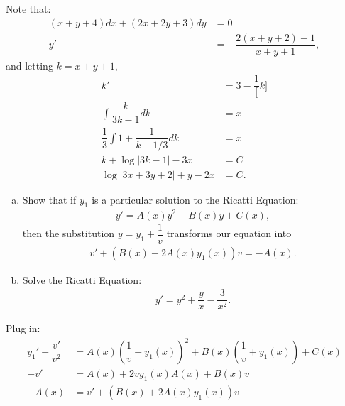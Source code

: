 \documentclass{article}
\begin{document}
    \newpage
    \begin{solution}[Solution 4d]
        Note that:
        \begin{align}
            (x+y+4)dx + (2x+2y+3)dy &= 0 \\ 
            y' &= -\dfrac{2(x+y+2)-1}{x+y+1},
        \end{align}
        and letting $k = x+y+1$,
        \begin{align}
            k' &= 3 - \dfrac{1}[k] \\
            \int \dfrac{k}{3k-1} dk &= x \\ 
            \dfrac{1}{3} \int 1 + \dfrac{1}{k - 1/3} dk &= x \\ 
            k + \log |3k-1| - 3x &= C \\ 
            \log|3x+3y+2| + y-2x &= C. 
        \end{align}
    \end{solution}
    \newpage
    \begin{problem}
        \hfill \break
        \begin{enumerate}[(a)]
            \item Show that if $y_1$ is a particular solution to the Ricatti Equation:
            \begin{align}
                y' = A(x)y^2 + B(x)y + C(x),
            \end{align}
            then the substitution $y = y_1 + \dfrac{1}{v}$ transforms our equation into 
            \begin{align}
                v' + (B(x) + 2A(x)y_1(x))v = -A(x).
            \end{align}
            \item Solve the Ricatti Equation:
            \begin{align}
                y' = y^2 + \dfrac{y}{x} - \dfrac{3}{x^2}.
            \end{align}
        \end{enumerate}
    \end{problem}
    \begin{solution}[Problem 5a]
        Plug in:
        \begin{align}
            y_1' - \dfrac{v'}{v^2} &= A(x)\left(\dfrac{1}{v} + y_1(x)\right)^2 + B(x)\left(\dfrac{1}{v} + y_1(x)\right) + C(x) \\ 
            -v' &= A(x) + 2vy_1(x)A(x) + B(x)v \\ 
            -A(x) &= v' + (B(x) + 2A(x)y_1(x))v
        \end{align}
    \end{solution}
\end{document}

